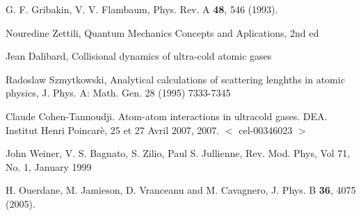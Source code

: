 \begin{thebibliography}{1000}
G. F. Gribakin, V. V. Flambaum, Phys. Rev. A {\bf 48}, 546 (1993).

Nouredine Zettili, Quantum Mechanics Concepts and Aplications, 2nd ed

Jean Dalibard, Collisional dynamics of ultra-cold atomic gases

Radoslaw Szmytkowski, Analytical calculations of scattering lenghths in atomic physics, J. Phys. A: Math. Gen. 28 (1995) 7333-7345
  
Claude Cohen-Tannoudji. Atom-atom interactions in ultracold gases. DEA. Institut Henri Poincar\`{e}, 25 et 27 Avril 2007, 2007. $<$ cel-00346023 $>$

John Weiner, V. S. Bagnato, S. Zilio, Paul S. Jullienne, Rev. Mod. Phys, Vol 71, No. 1, January 1999

H. Ouerdane, M. Jamieson, D. Vranceanu and M. Cavagnero, J. Phys. B  {\bf 36}, 4075 (2005).

\end{thebibliography}

